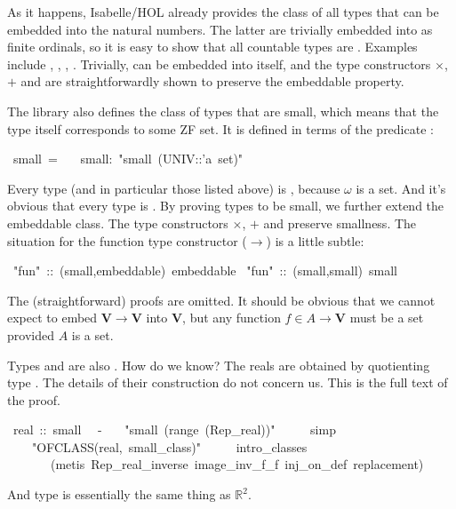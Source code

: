 \documentclass[runningheads]{llncs}
\newcommand{\V}{\mathbf{V}}
\begin{document}
As it happens, Isabelle/HOL already provides the class  of all types that can be embedded into the natural numbers. The latter are trivially embedded into  as finite ordinals, so it is easy to show that all countable types are .
Examples include , , , .
Trivially,  can be embedded into itself, and the type constructors $\times$, $+$ and  are straightforwardly shown to preserve the embeddable property.

The library also defines the class of types that are small, which means that the type itself corresponds to some ZF set. It is defined in terms of the predicate :
\begin{isabelle}
\ small\ =\isanewline
\ \ \ small:\ "small\ (UNIV::'a\ set)"
\end{isabelle}

Every  type (and in particular those listed above) is , because $\omega$ is a set. And it's obvious that every  type is . By proving types to be small, we further extend the embeddable class.
The type constructors $\times$, $+$ and  preserve smallness.
The situation for the function type constructor ($\to$) is a little subtle:
\begin{isabelle}
\ "fun"\ ::\ (small,embeddable)\ embeddable\isanewline
{}\ "fun"\ ::\ (small,small)\ small\end{isabelle}
The (straightforward) proofs are omitted.
It should be obvious that we cannot expect to embed $\V\to\V$ into $\V$, but any function $f\in A\to\V$ must be a set provided $A$ is a set.

Types  and  are also . How do we know? The reals are obtained by quotienting type . The details of their construction do not concern us.
This is the full text of the proof.
\begin{isabelle}
\ real\ ::\ small\ \isanewline
{}\ -\isanewline
\ \ \ "small\ (range\ (Rep\_real))"\isanewline
\ \ \ \ \ simp\isanewline
\ \ \ \ "OFCLASS(real,\ small\_class)"\isanewline
\ \ \ \ \ intro\_classes\isanewline
\ \ \ \ \ \ \ (metis\ Rep\_real\_inverse\ image\_inv\_f\_f\ inj\_on\_def\ replacement)\isanewline
{}
\end{isabelle}
And type  is essentially the same thing as $\mathbb{R}^2$.
\end{document}
